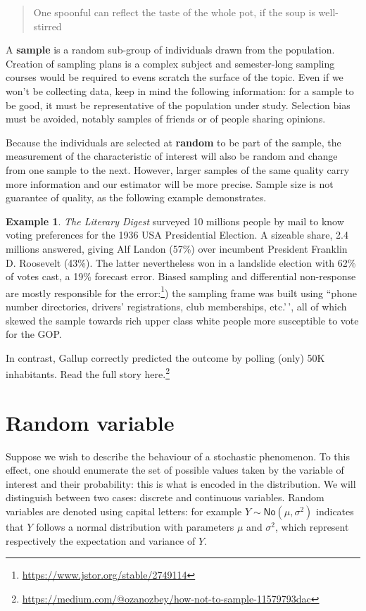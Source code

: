 \documentclass[
  11pt,
  letterpaper,
]{book}
\renewcommand{\href}[2]{#2\footnote{\url{#1}}}
\theoremstyle{definition}
\theoremstyle{definition}
\newtheorem{example}{Example}[chapter]
\theoremstyle{definition}
\theoremstyle{remark}
\begin{document}
\begin{quote}
One spoonful can reflect the taste of the whole pot, if the soup is well-stirred
\end{quote}

A \textbf{sample} is a random sub-group of individuals drawn from the population. Creation of sampling plans is a complex subject and semester-long sampling courses would be required to evens scratch the surface of the topic. Even if we won't be collecting data, keep in mind the following information: for a sample to be good, it must be representative of the population under study. Selection bias must be avoided, notably samples of friends or of people sharing opinions.

Because the individuals are selected at \textbf{random} to be part of the sample, the measurement of the characteristic of interest will also be random and change from one sample to the next. However, larger samples of the same quality carry more information and our estimator will be more precise. Sample size is not guarantee of quality, as the following example demonstrates.

\begin{example}
\protect\hypertarget{exm:Galluppoll}{}{\label{exm:Galluppoll} }
\emph{The Literary Digest} surveyed 10 millions people by mail to know voting preferences for the 1936 USA Presidential Election. A sizeable share, 2.4 millions answered, giving Alf Landon (57\%) over incumbent President Franklin D. Roosevelt (43\%). The latter nevertheless won in a landslide election with 62\% of votes cast, a 19\% forecast error. \href{https://www.jstor.org/stable/2749114}{Biased sampling and differential non-response are mostly responsible for the error:}) the sampling frame was built using ``phone number directories, drivers' registrations, club memberships, etc.'\,', all of which skewed the sample towards rich upper class white people more susceptible to vote for the GOP.

In contrast, Gallup correctly predicted the outcome by polling (only) 50K inhabitants. \href{https://medium.com/@ozanozbey/how-not-to-sample-11579793dac}{Read the full story here.}
\end{example}

\hypertarget{random-variable}{%
\section{Random variable}\label{random-variable}}

Suppose we wish to describe the behaviour of a stochastic phenomenon. To this effect, one should enumerate the set of possible values taken by the variable of interest and their probability: this is what is encoded in the distribution. We will distinguish between two cases: discrete and continuous variables. Random variables are denoted using capital letters: for example \(Y \sim \mathsf{No}(\mu, \sigma^2)\) indicates that \(Y\) follows a normal distribution with parameters \(\mu\) and \(\sigma^2\), which represent respectively the expectation and variance of \(Y\).
\end{document}
